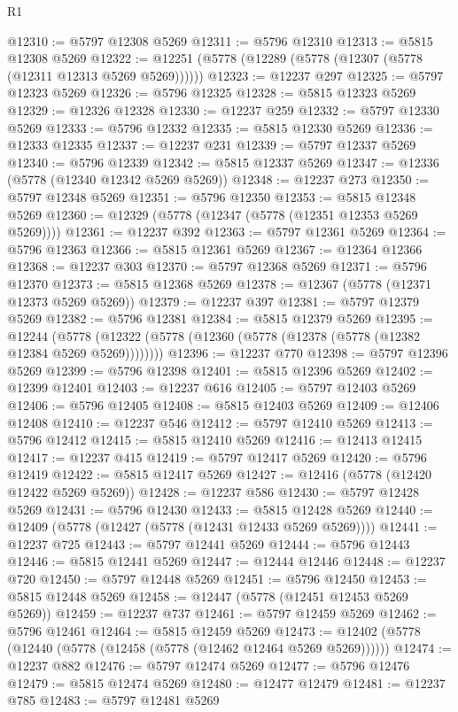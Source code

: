 \begin{lexlean}{R1}
\begin{coremodule}
@12310 := @5797 @12308 @5269
@12311 := @5796 @12310
@12313 := @5815 @12308 @5269
@12322 := @12251 (@5778 (@12289 (@5778 (@12307 (@5778 (@12311 @12313 @5269 @5269))))))
@12323 := @12237 @297
@12325 := @5797 @12323 @5269
@12326 := @5796 @12325
@12328 := @5815 @12323 @5269
@12329 := @12326 @12328
@12330 := @12237 @259
@12332 := @5797 @12330 @5269
@12333 := @5796 @12332
@12335 := @5815 @12330 @5269
@12336 := @12333 @12335
@12337 := @12237 @231
@12339 := @5797 @12337 @5269
@12340 := @5796 @12339
@12342 := @5815 @12337 @5269
@12347 := @12336 (@5778 (@12340 @12342 @5269 @5269))
@12348 := @12237 @273
@12350 := @5797 @12348 @5269
@12351 := @5796 @12350
@12353 := @5815 @12348 @5269
@12360 := @12329 (@5778 (@12347 (@5778 (@12351 @12353 @5269 @5269))))
@12361 := @12237 @392
@12363 := @5797 @12361 @5269
@12364 := @5796 @12363
@12366 := @5815 @12361 @5269
@12367 := @12364 @12366
@12368 := @12237 @303
@12370 := @5797 @12368 @5269
@12371 := @5796 @12370
@12373 := @5815 @12368 @5269
@12378 := @12367 (@5778 (@12371 @12373 @5269 @5269))
@12379 := @12237 @397
@12381 := @5797 @12379 @5269
@12382 := @5796 @12381
@12384 := @5815 @12379 @5269
@12395 := @12244
    (@5778 (@12322 (@5778 (@12360 (@5778 (@12378 (@5778 (@12382 @12384 @5269 @5269))))))))
@12396 := @12237 @770
@12398 := @5797 @12396 @5269
@12399 := @5796 @12398
@12401 := @5815 @12396 @5269
@12402 := @12399 @12401
@12403 := @12237 @616
@12405 := @5797 @12403 @5269
@12406 := @5796 @12405
@12408 := @5815 @12403 @5269
@12409 := @12406 @12408
@12410 := @12237 @546
@12412 := @5797 @12410 @5269
@12413 := @5796 @12412
@12415 := @5815 @12410 @5269
@12416 := @12413 @12415
@12417 := @12237 @415
@12419 := @5797 @12417 @5269
@12420 := @5796 @12419
@12422 := @5815 @12417 @5269
@12427 := @12416 (@5778 (@12420 @12422 @5269 @5269))
@12428 := @12237 @586
@12430 := @5797 @12428 @5269
@12431 := @5796 @12430
@12433 := @5815 @12428 @5269
@12440 := @12409 (@5778 (@12427 (@5778 (@12431 @12433 @5269 @5269))))
@12441 := @12237 @725
@12443 := @5797 @12441 @5269
@12444 := @5796 @12443
@12446 := @5815 @12441 @5269
@12447 := @12444 @12446
@12448 := @12237 @720
@12450 := @5797 @12448 @5269
@12451 := @5796 @12450
@12453 := @5815 @12448 @5269
@12458 := @12447 (@5778 (@12451 @12453 @5269 @5269))
@12459 := @12237 @737
@12461 := @5797 @12459 @5269
@12462 := @5796 @12461
@12464 := @5815 @12459 @5269
@12473 := @12402 (@5778 (@12440 (@5778 (@12458 (@5778 (@12462 @12464 @5269 @5269))))))
@12474 := @12237 @882
@12476 := @5797 @12474 @5269
@12477 := @5796 @12476
@12479 := @5815 @12474 @5269
@12480 := @12477 @12479
@12481 := @12237 @785
@12483 := @5797 @12481 @5269

\end{coremodule}
\end{lexlean}
